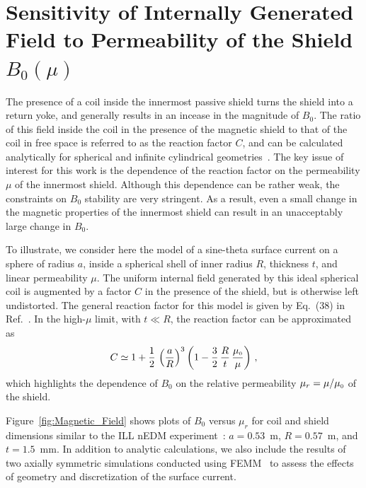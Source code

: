 

\section{Sensitivity of Internally Generated Field to Permeability of the Shield $B_0(\mu)$\label{sec:calculation}}

The presence of a coil inside the innermost passive shield turns
 the shield into a return yoke, and generally results in an incease
 in the magnitude of $B_0$. %
 The ratio of this field inside the 
coil in the presence of the magnetic shield to that of the coil in
free space is referred to as the reaction factor $C$, and can be calculated analytically
for spherical and infinite cylindrical geometries~\cite{bib:bidinostimartin,bib:urankar}. 
The key issue of interest for this work is the dependence of the
reaction factor on the permeability $\mu$ of the innermost shield.    Although this
dependence can be rather weak, the constraints on $B_0$ stability are very stringent.
As a result, even a small change in the magnetic properties of the innermost shield
can result in an unacceptably large change in $B_0$.


To illustrate, we consider here the model of a sine-theta surface current on a sphere of radius $a$, inside a spherical shell of inner radius $R$, thickness $t$, and linear permeability $\mu$.  
%
The uniform internal field generated by this ideal spherical coil is augmented by a factor $C$ in the presence of the shield, but is otherwise left undistorted.  The general  reaction factor for this model is given by Eq.~(38) in Ref.~\cite{bib:bidinostimartin}.  In the high-$\mu$ limit, with $t\ll R$,  the reaction factor can be approximated as
%
\begin{equation}
C 
 \simeq 1+ \frac{1}{2}\, \left( \frac{a}{R} \right)^{3} \left( 1- \frac{3}{2} \, \frac{R}{t} \, \frac{\mu_{\scriptscriptstyle 0}}{\mu} \right) \, ,
 \label{Csphere}
\end{equation}
which highlights the dependence of $B_0$ on the relative permeability $\mu_r=\mu/\mu_{\scriptscriptstyle 0}$ of the shield. 



Figure~\ref{fig:Magnetic_Field} shows plots of $B_0$ versus $\mu_r$ for coil and shield dimensions
similar to the ILL nEDM experiment~\cite{bib:baker,bib:knecht}:  $a=0.53$~m, $R= 0.57$~m, and  $t=1.5$~mm.
In addition to analytic calculations, we also include the results of
two axially symmetric simulations conducted using FEMM~\cite{bib:femm}
  to assess the effects of geometry and discretization of the surface current.

